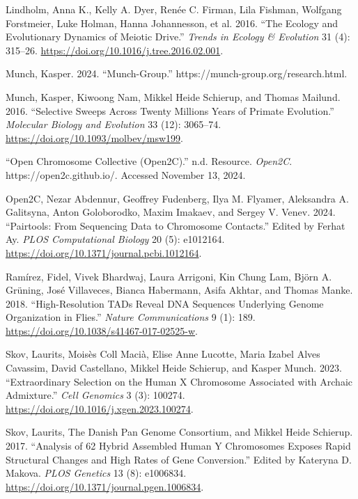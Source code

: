 \documentclass[
  11pt,
  a4paper,
]{scrbook}
\newlength{\cslhangindent}
\newenvironment{CSLReferences}[2] %
 {\begin{list}{}{%
  \setlength{\itemindent}{0pt}
  \setlength{\leftmargin}{0pt}
  \setlength{\parsep}{0pt}
  \ifodd #1
   \setlength{\leftmargin}{\cslhangindent}
   \setlength{\itemindent}{-1\cslhangindent}
  \fi
  \setlength{\itemsep}{#2\baselineskip}}}
 {\end{list}}
\let\oldemph\emph
\renewcommand\emph[1]{\oldemph{\color{gray}#1}}
\begin{document}
\begin{CSLReferences}{1}{0}
Lindholm, Anna K., Kelly A. Dyer, Renée C. Firman, Lila Fishman,
Wolfgang Forstmeier, Luke Holman, Hanna Johannesson, et al. 2016. {``The
{Ecology} and {Evolutionary Dynamics} of {Meiotic Drive}.''}
\emph{Trends in Ecology \& Evolution} 31 (4): 315--26.
\url{https://doi.org/10.1016/j.tree.2016.02.001}.

Munch, Kasper. 2024. {``Munch-Group.''}
https://munch-group.org/research.html.

Munch, Kasper, Kiwoong Nam, Mikkel Heide Schierup, and Thomas Mailund.
2016. {``Selective {Sweeps} Across {Twenty Millions Years} of {Primate
Evolution}.''} \emph{Molecular Biology and Evolution} 33 (12): 3065--74.
\url{https://doi.org/10.1093/molbev/msw199}.

{``Open {Chromosome Collective} ({Open2C}).''} n.d. Resource.
\emph{Open2C}. https://open2c.github.io/. Accessed November 13, 2024.

Open2C, Nezar Abdennur, Geoffrey Fudenberg, Ilya M. Flyamer, Aleksandra
A. Galitsyna, Anton Goloborodko, Maxim Imakaev, and Sergey V. Venev.
2024. {``Pairtools: {From} Sequencing Data to Chromosome Contacts.''}
Edited by Ferhat Ay. \emph{PLOS Computational Biology} 20 (5): e1012164.
\url{https://doi.org/10.1371/journal.pcbi.1012164}.

Ramírez, Fidel, Vivek Bhardwaj, Laura Arrigoni, Kin Chung Lam, Björn A.
Grüning, José Villaveces, Bianca Habermann, Asifa Akhtar, and Thomas
Manke. 2018. {``High-Resolution {TADs} Reveal {DNA} Sequences Underlying
Genome Organization in Flies.''} \emph{Nature Communications} 9 (1):
189. \url{https://doi.org/10.1038/s41467-017-02525-w}.

Skov, Laurits, Moisès Coll Macià, Elise Anne Lucotte, Maria Izabel Alves
Cavassim, David Castellano, Mikkel Heide Schierup, and Kasper Munch.
2023. {``Extraordinary Selection on the Human {X} Chromosome Associated
with Archaic Admixture.''} \emph{Cell Genomics} 3 (3): 100274.
\url{https://doi.org/10.1016/j.xgen.2023.100274}.

Skov, Laurits, The Danish Pan Genome Consortium, and Mikkel Heide
Schierup. 2017. {``Analysis of 62 Hybrid Assembled Human {Y} Chromosomes
Exposes Rapid Structural Changes and High Rates of Gene Conversion.''}
Edited by Kateryna D. Makova. \emph{PLOS Genetics} 13 (8): e1006834.
\url{https://doi.org/10.1371/journal.pgen.1006834}.


\end{CSLReferences}
\end{document}
